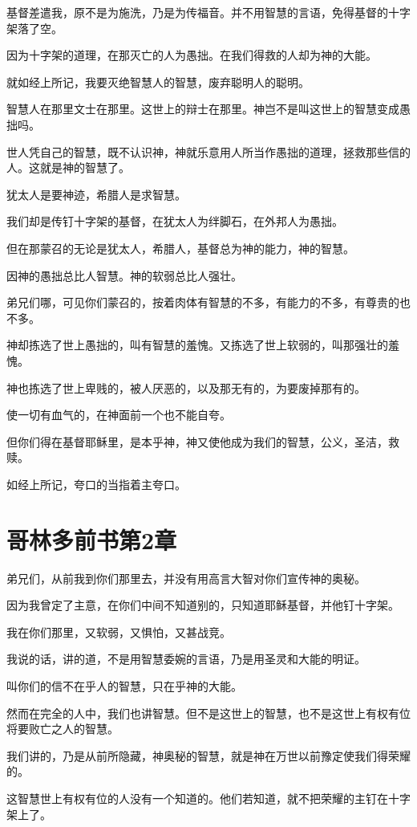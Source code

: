 \documentclass[12pt,oneside]{book}
\begin{document}
基督差遣我，原不是为施洗，乃是为传福音。并不用智慧的言语，免得基督的十字架落了空。

因为十字架的道理，在那灭亡的人为愚拙。在我们得救的人却为神的大能。

就如经上所记，我要灭绝智慧人的智慧，废弃聪明人的聪明。

智慧人在那里文士在那里。这世上的辩士在那里。神岂不是叫这世上的智慧变成愚拙吗。

世人凭自己的智慧，既不认识神，神就乐意用人所当作愚拙的道理，拯救那些信的人。这就是神的智慧了。

犹太人是要神迹，希腊人是求智慧。

我们却是传钉十字架的基督，在犹太人为绊脚石，在外邦人为愚拙。

但在那蒙召的无论是犹太人，希腊人，基督总为神的能力，神的智慧。

因神的愚拙总比人智慧。神的软弱总比人强壮。

弟兄们哪，可见你们蒙召的，按着肉体有智慧的不多，有能力的不多，有尊贵的也不多。

神却拣选了世上愚拙的，叫有智慧的羞愧。又拣选了世上软弱的，叫那强壮的羞愧。

神也拣选了世上卑贱的，被人厌恶的，以及那无有的，为要废掉那有的。

使一切有血气的，在神面前一个也不能自夸。

但你们得在基督耶稣里，是本乎神，神又使他成为我们的智慧，公义，圣洁，救赎。

如经上所记，夸口的当指着主夸口。

\chapter{哥林多前书第2章}
弟兄们，从前我到你们那里去，并没有用高言大智对你们宣传神的奥秘。

因为我曾定了主意，在你们中间不知道别的，只知道耶稣基督，并他钉十字架。

我在你们那里，又软弱，又惧怕，又甚战竞。

我说的话，讲的道，不是用智慧委婉的言语，乃是用圣灵和大能的明证。

叫你们的信不在乎人的智慧，只在乎神的大能。

然而在完全的人中，我们也讲智慧。但不是这世上的智慧，也不是这世上有权有位将要败亡之人的智慧。

我们讲的，乃是从前所隐藏，神奥秘的智慧，就是神在万世以前豫定使我们得荣耀的。

这智慧世上有权有位的人没有一个知道的。他们若知道，就不把荣耀的主钉在十字架上了。
\end{document}
